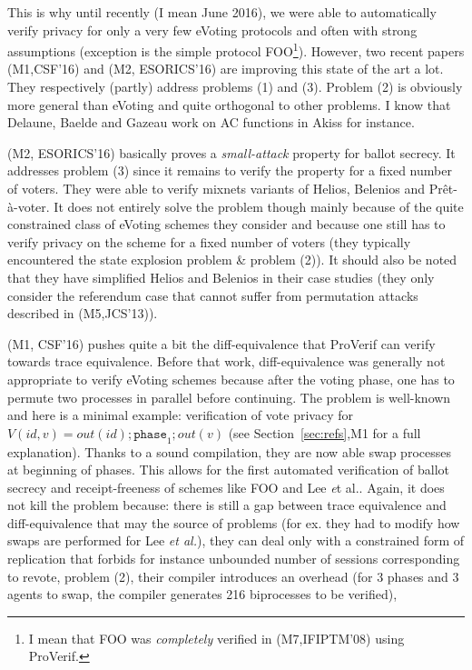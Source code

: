 This is why until recently (I mean June 2016), we were able to automatically verify privacy for only a very few eVoting protocols
and often with strong assumptions (exception is the simple protocol FOO\footnote{I mean that FOO was {\em completely} verified in (M7,IFIPTM'08) using ProVerif.}).
However, two recent papers (M1,CSF'16) and (M2, ESORICS'16) are improving this state of the art a lot.
They respectively (partly) address problems (1) and (3).
Problem (2) is obviously more general than eVoting and quite orthogonal to other problems.
I know that Delaune, Baelde and Gazeau work on AC functions in Akiss for instance.

(M2, ESORICS'16) basically proves a {\it small-attack} property for ballot secrecy. It addresses problem (3) since
it remains to verify the property for a fixed number of voters.
They were able to verify mixnets variants of Helios, Belenios and Prêt-à-voter.
It does not entirely solve the problem though mainly because of
the quite constrained class of eVoting schemes they consider and because one still has to verify privacy on the
scheme for a fixed number of voters (\eg they typically encountered the state explosion problem \& problem (2)).
It should also be noted that they have simplified Helios and Belenios in their case studies (\eg they only consider
the referendum case that cannot suffer from permutation attacks described in (M5,JCS'13)).

(M1, CSF'16) pushes quite a bit the diff-equivalence that ProVerif can verify towards trace equivalence.
Before that work, diff-equivalence was generally not appropriate to verify
eVoting schemes because after the voting phase, one has to permute two processes in parallel before continuing.
The problem is well-known and here is a minimal example: verification of vote privacy for
$V(id,v)=out(id);  \texttt{phase}_1; out(v)$ (see Section~\ref{sec:refs},M1 for a full explanation).
Thanks to a sound compilation, they are now able swap processes at beginning of phases. 
This allows for the first automated verification of ballot secrecy and receipt-freeness of
schemes like FOO and Lee {\textit et al.}.
Again, it does not kill the problem because: there is still a gap between trace equivalence and diff-equivalence that
may the source of problems (for ex. they had to modify how swaps are performed for Lee {\it et al.}),
they can deal only with a constrained form of replication that forbids for instance unbounded number of sessions corresponding to revote,
problem (2),
their compiler introduces an overhead (\eg for 3 phases and 3 agents to swap, the compiler generates 216 biprocesses to be verified),
\etc


